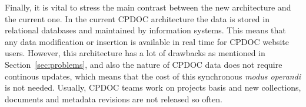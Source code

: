 Finally, it is vital to stress the main contrast between the new
architecture and the current one. In the current CPDOC architecture
the data is stored in relational databases and maintained by
information systems. This means that any data modification or
insertion is available in real time for CPDOC website users. However, this architecture has a lot of drawbacks as mentioned in
Section~\ref{sec:problems}, and also the nature of
CPDOC data does not require continous updates, which means that the
cost of this synchronous \emph{modus operandi} is not
needed. Usually, CPDOC teams work on projects basis and new
collections, documents and metadata revisions are not released so often.





